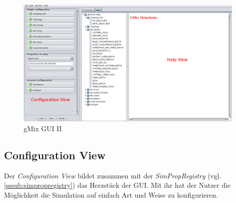 \documentclass[a4paper, 11pt]{article} %
\begin{document}
\begin{figure}[!htp]
\includegraphics[width=\textwidth]{img/gMixGuiHelp}
\caption{gMix GUI II}
\label{fig:gui2}
\end{figure}

\subsection{Configuration View} %
\label{ssub:configview}
Der \emph{Configuration View} bildet zusammen mit der \emph{SimPropRegistry} (vgl. \ref{sssub:simpropregistry}) das Herzstück der GUI. Mit ihr hat der Nutzer die Möglichkeit die Simulation auf einfach Art und Weise zu konfigurieren. \\
\end{document}

